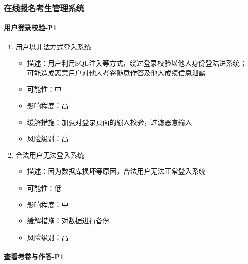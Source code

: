 \documentclass[hyperref, a4paper]{ctexart}
\providecommand{\tightlist}{%
  \setlength{\itemsep}{0pt}\setlength{\parskip}{0pt}}
\let\oldparagraph\paragraph
\renewcommand{\paragraph}[1]{\oldparagraph{#1}\mbox{}}
\begin{document}
\hypertarget{ux5728ux7ebfux62a5ux540dux8003ux751fux7ba1ux7406ux7cfbux7edf-1}{%
\subsubsection{在线报名考生管理系统}\label{ux5728ux7ebfux62a5ux540dux8003ux751fux7ba1ux7406ux7cfbux7edf-1}}

\hypertarget{ux7528ux6237ux767bux5f55ux6821ux9a8c-p1-1}{%
\paragraph{用户登录校验-P1}\label{ux7528ux6237ux767bux5f55ux6821ux9a8c-p1-1}}

\begin{enumerate}
\def\labelenumi{\arabic{enumi}.}
\tightlist
\item
  用户以非法方式登入系统

  \begin{itemize}
  \tightlist
  \item
    描述：用户利用SQL注入等方式，绕过登录校验以他人身份登陆进系统；可能造成恶意用户对他人考卷随意作答及他人成绩信息泄露
  \item
    可能性：中
  \item
    影响程度：高
  \item
    缓解措施：加强对登录页面的输入校验，过滤恶意输入
  \item
    风险级别：高
  \end{itemize}
\item
  合法用户无法登入系统

  \begin{itemize}
  \tightlist
  \item
    描述：因为数据库损坏等原因，合法用户无法正常登入系统
  \item
    可能性：低
  \item
    影响程度：中
  \item
    缓解措施：对数据进行备份
  \item
    风险级别：高
  \end{itemize}
\end{enumerate}

\hypertarget{ux67e5ux770bux8003ux5377ux4e0eux4f5cux7b54-p1}{%
\paragraph{查看考卷与作答-P1}\label{ux67e5ux770bux8003ux5377ux4e0eux4f5cux7b54-p1}}
\end{document}

